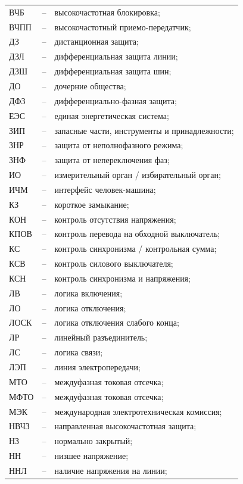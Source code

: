 \begin{longtable}{>{\raggedright\arraybackslash}m{2cm}>{\raggedright\arraybackslash}m{0.5cm}>{\raggedright\arraybackslash}m{20cm}}
ВЧБ & -- & высокочастотная блокировка; \\
ВЧПП & -- & высокочастотный приемо-передатчик; \\
ДЗ & -- & дистанционная защита; \\
ДЗЛ & -- & дифференциальная защита линии; \\
ДЗШ & -- & дифференциальная защита шин; \\
ДО & -- & дочерние общества; \\
ДФЗ & -- & дифференциально-фазная защита; \\
ЕЭС & -- & единая энергетическая система; \\
ЗИП & -- & запасные части, инструменты и принадлежности; \\
ЗНР & -- & защита от неполнофазного режима; \\
ЗНФ & -- & защита от непереключения фаз; \\
ИО & -- & измерительный орган / избирательный орган; \\
ИЧМ & -- & интерфейс человек-машина; \\
КЗ & -- & короткое замыкание; \\
КОН & -- & контроль отсутствия напряжения; \\
КПОВ & -- & контроль перевода на обходной выключатель; \\
КС & -- & контроль синхронизма / контрольная сумма; \\
КСВ & -- & контроль силового выключателя; \\
КСН & -- & контроль синхронизма и напряжения; \\
ЛВ & -- & логика включения; \\
ЛО & -- & логика отключения; \\
ЛОСК & -- & логика отключения слабого конца; \\
ЛР & -- & линейный разъединитель; \\
ЛС & -- & логика связи; \\
ЛЭП & -- & линия электропередачи; \\
МТО & -- & междуфазная токовая отсечка; \\
МФТО & -- & междуфазная токовая отсечка; \\
МЭК & -- & международная электротехническая комиссия; \\
НВЧЗ & -- & направленная высокочастотная защита; \\
НЗ & -- & нормально закрытый; \\
НН & -- & низшее напряжение; \\
ННЛ & -- & наличие напряжения на линии; \\

\end{longtable}
